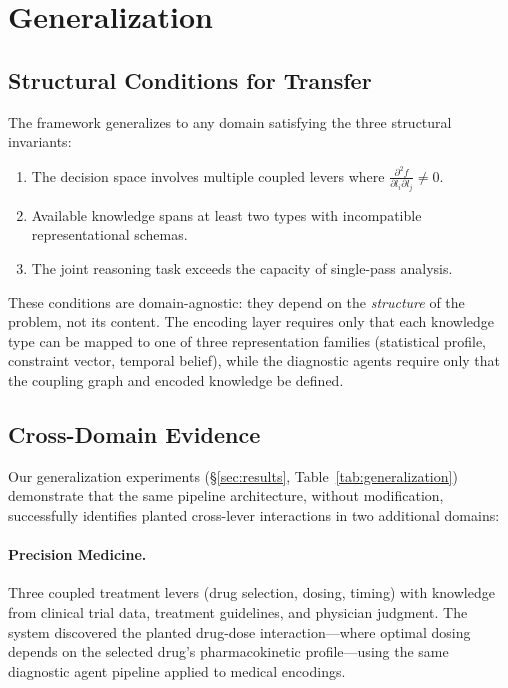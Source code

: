 \documentclass[11pt,a4paper]{article}
\begin{document}
\section{Generalization}
\label{sec:generalization}

\subsection{Structural Conditions for Transfer}

The framework generalizes to any domain satisfying the three structural invariants:
\begin{enumerate}
    \item The decision space involves multiple coupled levers where $\frac{\partial^2 f}{\partial l_i \partial l_j} \neq 0$.
    \item Available knowledge spans at least two types with incompatible representational schemas.
    \item The joint reasoning task exceeds the capacity of single-pass analysis.
\end{enumerate}

These conditions are domain-agnostic: they depend on the \emph{structure} of the problem, not its content.
The encoding layer requires only that each knowledge type can be mapped to one of three representation families (statistical profile, constraint vector, temporal belief), while the diagnostic agents require only that the coupling graph and encoded knowledge be defined.

\subsection{Cross-Domain Evidence}

Our generalization experiments (\S\ref{sec:results}, Table~\ref{tab:generalization}) demonstrate that the same pipeline architecture, without modification, successfully identifies planted cross-lever interactions in two additional domains:

\paragraph{Precision Medicine.}
Three coupled treatment levers (drug selection, dosing, timing) with knowledge from clinical trial data, treatment guidelines, and physician judgment.
The system discovered the planted drug-dose interaction---where optimal dosing depends on the selected drug's pharmacokinetic profile---using the same diagnostic agent pipeline applied to medical encodings.
\end{document}
